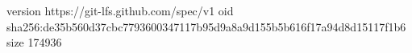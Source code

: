 version https://git-lfs.github.com/spec/v1
oid sha256:de35b560d37cbc7793600347117b95d9a8a9d155b5b616f17a94d8d15117f1b6
size 174936
